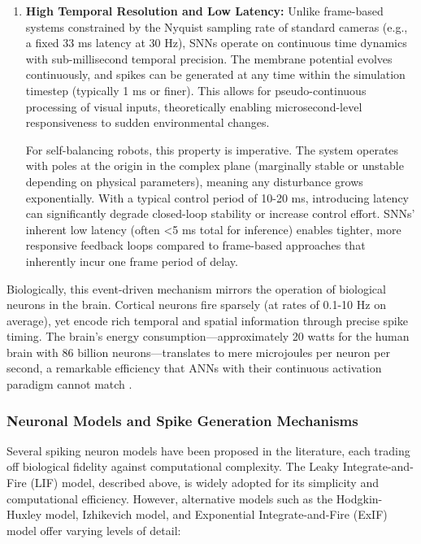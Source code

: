 \begin{enumerate}
\item \textbf{High Temporal Resolution and Low Latency:} 
Unlike frame-based systems constrained by the Nyquist sampling rate of standard cameras (e.g., a fixed 
33 ms latency at 30 Hz), SNNs operate on continuous time dynamics with sub-millisecond temporal precision. 
The membrane potential evolves continuously, and spikes can be generated at any time within the simulation 
timestep (typically 1 ms or finer). This allows for pseudo-continuous processing of visual inputs, theoretically 
enabling microsecond-level responsiveness to sudden environmental changes.

For self-balancing robots, this property is imperative. The system operates with poles at the origin in the 
complex plane (marginally stable or unstable depending on physical parameters), meaning any disturbance grows 
exponentially. With a typical control period of 10-20 ms, introducing latency can significantly degrade closed-loop 
stability or increase control effort. SNNs' inherent low latency (often <5 ms total for inference) enables tighter, 
more responsive feedback loops compared to frame-based approaches that inherently incur one frame period of delay.

\end{enumerate}

Biologically, this event-driven mechanism mirrors the operation of biological neurons in the brain. Cortical 
neurons fire sparsely (at rates of 0.1-10 Hz on average), yet encode rich temporal and spatial information 
through precise spike timing. The brain's energy consumption—approximately 20 watts for the human brain with 
86 billion neurons—translates to mere microjoules per neuron per second, a remarkable efficiency that ANNs 
with their continuous activation paradigm cannot match \cite{lennie2003cost}.





\subsubsection{Neuronal Models and Spike Generation Mechanisms}

Several spiking neuron models have been proposed in the literature, each trading off biological 
fidelity against computational complexity. The Leaky Integrate-and-Fire (LIF) model, described above, 
is widely adopted for its simplicity and computational efficiency. However, alternative models such as 
the Hodgkin-Huxley model, Izhikevich model, and Exponential Integrate-and-Fire (ExIF) model offer 
varying levels of detail:

